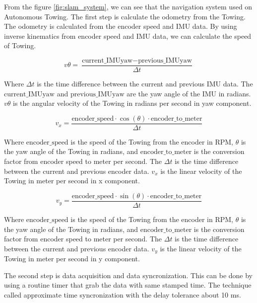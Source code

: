 \documentclass[conference]{IEEEtran}
\begin{document}
From the figure \ref{fig:slam_system}, we can see that the navigation system used on Autonomous Towing. The first step is calculate the odometry from the Towing. The odometry is calculated from the encoder speed and IMU data. By using inverse kinematics from encoder speed and IMU data, we can calculate the speed of Towing. 

\begin{equation}
	v\theta = \frac{\text{current\_IMUyaw} - \text{previous\_IMUyaw}}{\Delta t}
	\label{eq:vtheta}
\end{equation}

Where \(\Delta t\) is the time difference between the current and previous IMU data. The \(\text{current\_IMUyaw}\) and \(\text{previous\_IMUyaw}\) are the yaw angle of the IMU in radians. \(v\theta\) is the angular velocity of the Towing in radians per second in yaw component.

\begin{equation}
	v_x = \frac{\text{encoder\_speed} \cdot \cos(\theta) \cdot \text{encoder\_to\_meter}}{\Delta t}
	\label{eq:vx}
\end{equation}

Where \(\text{encoder\_speed}\) is the speed of the Towing from the encoder in RPM, \(\theta\) is the yaw angle of the Towing in radians, and \(\text{encoder\_to\_meter}\) is the conversion factor from encoder speed to meter per second. The \(\Delta t\) is the time difference between the current and previous encoder data. \(v_x\) is the linear velocity of the Towing in meter per second in x component.

\begin{equation}
	v_y = \frac{\text{encoder\_speed} \cdot \sin(\theta) \cdot \text{encoder\_to\_meter}}{\Delta t}
	\label{eq:vy}
\end{equation}

Where \(\text{encoder\_speed}\) is the speed of the Towing from the encoder in RPM, \(\theta\) is the yaw angle of the Towing in radians, and \(\text{encoder\_to\_meter}\) is the conversion factor from encoder speed to meter per second. The \(\Delta t\) is the time difference between the current and previous encoder data. \(v_y\) is the linear velocity of the Towing in meter per second in y component.

\par    
The second step is data acquisition and data syncronization. This can be done by using a routine timer that grab the data with same stamped time. The technique called approximate time syncronization with the delay tolerance about 10 ms. 
\end{document}
